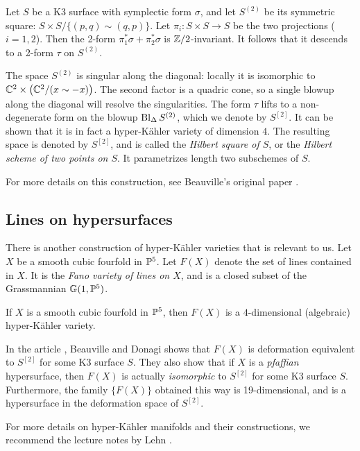 Let $S$ be a K3 surface with symplectic form $\sigma$, and let $S^{(2)}$ be its symmetric square: $S \times S / \{ (p,q) \sim (q,p) \}$. Let $\pi_i:S \times S \to S$ be the two projections ($i=1,2$). Then the 2-form $\pi_1^\ast \sigma + \pi_2^\ast \sigma$ is $\Z/2$-invariant. It follows that it descends to a 2-form $\tau$ on $S^{(2)}$.

The space $S^{(2)}$ is singular along the diagonal: locally it is isomorphic to $\C^2 \times \left(\C^2 /(x \sim -x)\right)$. The second factor is a quadric cone, so a single blowup along the diagonal will resolve the singularities. The form $\tau$ lifts to a non-degenerate form on the blowup $\Bl_\Delta S^{(2)}$, which we denote by $S^{[2]}$. It can be shown that it is in fact a hyper-Kähler variety of dimension $4$. The resulting space is denoted by $S^{[2]}$, and is called the \emph{Hilbert square of $S$}, or the \emph{Hilbert scheme of two points on $S$}. It parametrizes length two subschemes of $S$.

For more details on this construction, see Beauville's original paper \cite{beauville_hyperkahler}.

\subsection{Lines on hypersurfaces}

There is another construction of hyper-Kähler varieties that is relevant to us. Let $X$ be a smooth cubic fourfold in $\P^5$. Let $F(X)$ denote the set of lines contained in $X$. It is the \emph{Fano variety of lines on $X$}, and is a closed subset of the Grassmannian $\mathbb G(1,\P^5)$.

\begin{proposition}
If $X$ is a smooth cubic fourfold in $\P^5$, then $F(X)$ is a $4$-dimensional (algebraic) hyper-Kähler variety.
\end{proposition}

In the article \cite{beauville_donagi_fano}, Beauville and Donagi shows that $F(X)$ is deformation equivalent to $S^{[2]}$ for some K3 surface $S$. They also show that if $X$ is a \emph{pfaffian} hypersurface, then $F(X)$ is actually \emph{isomorphic} to $S^{[2]}$ for some K3 surface $S$. Furthermore, the family $\{ F(X) \}$  obtained this way is 19-dimensional, and is a hypersurface in the deformation space of $S^{[2]}$.

For more details on hyper-Kähler manifolds and their constructions, we recommend the lecture notes by Lehn \cite{lehn_symplectic}.


